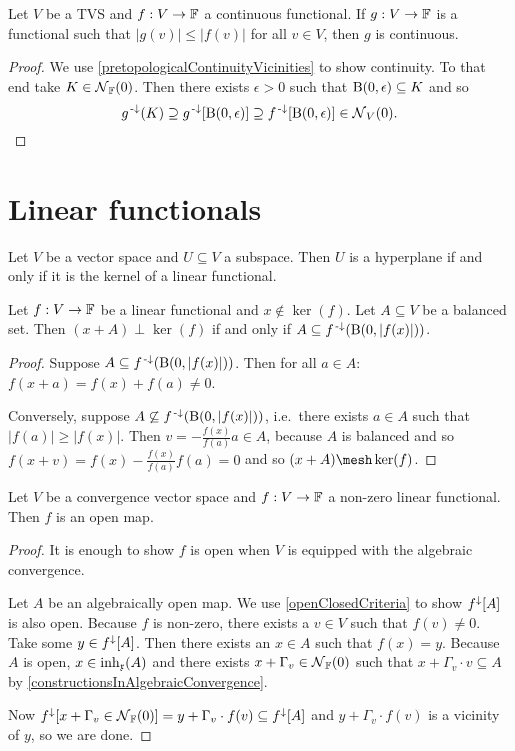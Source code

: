 \begin{lemma} \label{continuityDominatedFunctional}
Let $V$ be a TVS and $f:V\to \mathbb{F}$ a continuous functional. If $g:V\to \mathbb{F}$ is a functional such that $|g(v)|\leq |f(v)|$ for all $v\in V$, then $g$ is continuous.
\end{lemma}
\begin{proof}
We use \ref{pretopologicalContinuityVicinities} to show continuity. To that end take $K\in \operatorname{\mathcal{N}}_{\mathbb{F}}(0)$. Then there exists $\epsilon >0$ such that $\operatorname{B}(0,\epsilon)\subseteq K$ and so
\[ g^{{\text{\hspace{0.15em}-}\downarrow}}(K) \supseteq g^{\text{\hspace{0.15em}-}\downarrow}[\operatorname{B}(0,\epsilon)] \supseteq f^{\text{\hspace{0.15em}-}\downarrow}[\operatorname{B}(0,\epsilon)] \in \operatorname{\mathcal{N}}_V(0). \]
\end{proof}

\section{Linear functionals}
\begin{lemma} \label{kernelHyperplane}
Let $V$ be a vector space and $U\subseteq V$ a subspace. Then $U$ is a hyperplane \textup{if and only if} it is the kernel of a linear functional.
\end{lemma}

\begin{lemma} \label{functionalBoundedNeighbourhood}
Let $f: V\to \mathbb{F}$ be a linear functional and $x\notin \ker(f)$. Let $A\subseteq V$ be a balanced set. Then $(x+A)\perp \ker(f)$ \textup{if and only if} $A \subseteq f^{{\text{\hspace{0.15em}-}\downarrow}}(\operatorname{B}(0,|f(x)|))$.
\end{lemma}
\begin{proof}
Suppose $A \subseteq f^{{\text{\hspace{0.15em}-}\downarrow}}(\operatorname{B}(0,|f(x)|))$. Then for all $a\in A$: $f(x+a) = f(x) + f(a) \neq 0$.

Conversely, suppose $A \not\subseteq f^{{\text{\hspace{0.15em}-}\downarrow}}(\operatorname{B}(0,|f(x)|))$, i.e.\ there exists $a\in A$ such that $|f(a)| \geq |f(x)|$. Then $v= -\frac{f(x)}{f(a)}a\in A$, because $A$ is balanced and so $f(x+ v) = f(x)-\frac{f(x)}{f(a)}f(a) = 0$ and so $(x+A) \mesh \ker(f)$.
\end{proof}

\begin{proposition} \label{linearFunctionalOpen}
Let $V$ be a convergence vector space and $f:V\to \mathbb{F}$ a non-zero linear functional. Then $f$ is an open map.
\end{proposition}
\begin{proof}
It is enough to show $f$ is open when $V$ is equipped with the algebraic convergence.

Let $A$ be an algebraically open map. We use \ref{openClosedCriteria} to show $f^\downarrow[A]$ is also open. Because $f$ is non-zero, there exists a $v\in V$ such that $f(v) \neq 0$. Take some $y\in f^\downarrow[A]$. Then there exists an $x\in A$ such that $f(x) = y$. Because $A$ is open, $x\in \operatorname{inh}_\mathfrak{x}(A)$ and there exists $x+ \Gamma_v\in \operatorname{\mathcal{N}}_{\mathbb{F}}(0)$ such that $x+\Gamma_v\cdot v \subseteq A$ by \ref{constructionsInAlgebraicConvergence}.

Now $f^\downarrow[x+ \Gamma_v\in \operatorname{\mathcal{N}}_{\mathbb{F}}(0)] = y+\Gamma_v \cdot f(v) \subseteq f^\downarrow[A]$ and $y+\Gamma_v \cdot f(v)$ is a vicinity of $y$, so we are done.
\end{proof}

